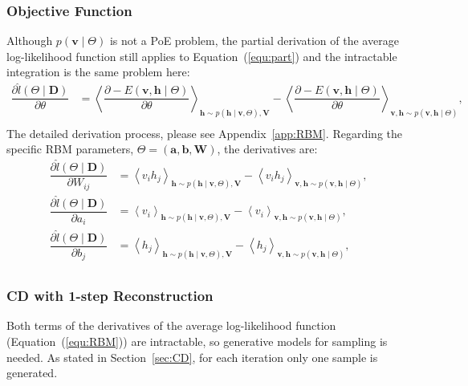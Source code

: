 \subsubsection{Objective Function}
Although $ p(\mathbf{v} \mid \Theta) $ is not a PoE problem, the partial derivation of the average log-likelihood function still applies to Equation~(\ref{equ:part}) and the intractable integration is the same problem here:
\begin{equation}
\label{equ:RBM}
\begin{aligned}
\dfrac{\partial \hat{l} (\Theta \mid \mathbf{D})}{\partial \theta} 
& = \left \langle \dfrac{\partial -E(\mathbf{v}, \mathbf{h} \mid \Theta)}{\partial \theta} \right \rangle_{\mathbf{h} \sim p( \mathbf{h} \mid \mathbf{v}, \Theta), \mathbf{V}} 
- \left \langle \dfrac{\partial -E(\mathbf{v}, \mathbf{h} \mid \Theta)}{\partial \theta} \right \rangle_{\mathbf{v}, \mathbf{h} \sim p( \mathbf{v}, \mathbf{h} \mid  \Theta)},  \\
\end{aligned}
\end{equation}
The detailed derivation process, please see Appendix~\ref{app:RBM}.
Regarding the specific RBM parameters,  $ \Theta = (\mathbf{a}, \mathbf{b}, \mathbf{W}) $, the derivatives are:
\begin{equation}
\label{equ:RBM_2}
\begin{aligned}
\dfrac{\partial \hat{l} (\Theta \mid \mathbf{D})}{\partial W_{ij}} 
& = \left \langle v_i h_j \right \rangle_{\mathbf{h} \sim p( \mathbf{h} \mid \mathbf{v}, \Theta), \mathbf{V}} 
- \left \langle  v_i h_j \right \rangle_{\mathbf{v}, \mathbf{h} \sim p( \mathbf{v}, \mathbf{h} \mid  \Theta)},  \\
\dfrac{\partial \hat{l} (\Theta \mid \mathbf{D})}{\partial a_{i}} 
& = \left \langle v_i \right \rangle_{\mathbf{h} \sim p( \mathbf{h} \mid \mathbf{v}, \Theta), \mathbf{V}} 
- \left \langle  v_i \right \rangle_{\mathbf{v}, \mathbf{h} \sim p( \mathbf{v}, \mathbf{h} \mid  \Theta)},  \\
\dfrac{\partial \hat{l} (\Theta \mid \mathbf{D})}{\partial b_{j}} 
& = \left \langle h_j \right \rangle_{\mathbf{h} \sim p( \mathbf{h} \mid \mathbf{v}, \Theta), \mathbf{V}} 
- \left \langle  h_j \right \rangle_{\mathbf{v}, \mathbf{h} \sim p( \mathbf{v}, \mathbf{h} \mid  \Theta)},  \\
\end{aligned}
\end{equation}	 
\subsubsection{CD with 1-step Reconstruction}
\label{sec:cd}
Both terms of the derivatives of the average log-likelihood function (Equation~(\ref{equ:RBM})) are intractable, so generative models for sampling is needed.
As stated in Section~\ref{sec:CD}, for each iteration only one sample is generated.

